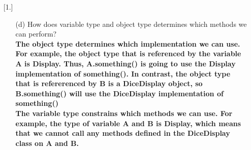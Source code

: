 \documentclass[letter]{article}
\begin{document}
\begin{enumerate} [1.]
\begin{itemize}
\begin{verbatim}
    @Override
    public void something() {
        System.out.println("Zap!");
    }
    
    public int showNumSides() {
        System.out.println(numSides);
    }
}
        \end{verbatim}

    What is the output each following case? Can you identify which lines will produce an error?\\\\
    Display A = new Display();\\
    A.something();// output: Foo!\\
    A.showNumSides();// Error\\
    ((DiceDisplay) A).showNumSides();// Error, because DiceDisplay is a subclass of Display, but the variable type cannot be more specific than the object type. \\
    
    Display B = new DiceDisplay(1);\\
    B.something(); //output: Zap!\\
    B.showNumSides();// Error \\
    ((DiceDisplay) B).showNumSides(); Output: 1\\

    DiceDisplay C = new DiceDisplay(2);\\
    C.something(); Output: Zap!\\
    C.showNumSides(); Output: 2\\
    ((Display) C).something(); Output: Zap! (because despite that the variable type is Display, the object's type remains a DiceDisplay, so C.something() is going to use the DiceDisplay implementation of something()) (also see (d) for further explanation)\\

    \item [(d)] How does variable type and object type determines which methods we can perform?\\

    \textbf{The object type determines which implementation we can use. For example, the object type that is referenced by the variable A is Display. Thus, A.something() is going to use the Display implementation of something(). In contrast, the object type that is refererenced by B is a DiceDisplay object, so B.something() will use the DiceDisplay implementation of something()}\\
    
    \textbf{The variable type constrains which methods we can use. For example, the type of variable A and B is Display, which means that we cannot call any methods defined in the DiceDisplay class on A and B.}\\ 
    

\end{itemize}
\end{enumerate}
\end{document}
